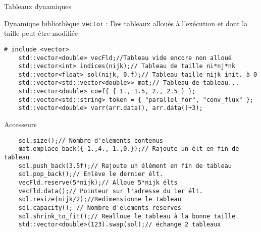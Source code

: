 \documentclass[handout,10pt]{beamer}
\begin{document}
\begin{frame}[fragile]{Tableaux dynamiques}
\tiny
\begin{block}{Dynamique}
bibliothèque \texttt{vector} : Des tableaux alloués à l'exécution et dont la taille peut être modifiée
\begin{lstlisting}
# include <vector>
    std::vector<double> vecFld;//Tableau vide encore non alloué
    std::vector<int> indices(nijk);// Tableau de taille ni*nj*nk
    std::vector<float> sol(nijk, 0.f);// Tableau taille nijk init. à 0
    std::vector<std::vector<double>> mat;// Tableau de tableau...
    std::vector<double> coef{ { 1., 1.5, 2., 2.5 } };
    std::vector<std::string> token = { "parallel_for", "conv_flux" };
    std::vector<double> varr(arr.data(), arr.data()+3);
\end{lstlisting}
\end{block}

\begin{block}{Accesseurs}
\begin{lstlisting}
    sol.size();// Nombre d'elements contenus
    mat.emplace_back({-1.,4.,-1.,0.});// Rajoute un élt en fin de tableau
    sol.push_back(3.5f);// Rajoute un élément en fin de tableau
    sol.pop_back();// Enlève le dernier élt.
    vecFld.reserve(5*nijk);// Alloue 5*nijk élts
    vecFld.data();// Pointeur sur l'adresse du 1er élt.
    sol.resize(nijk/2);//Redimensionne le tableau
    sol.capacity(); // Nombre d'elements reserves
    sol.shrink_to_fit();// Realloue le tableau à la bonne taille
    std::vector<double>(123).swap(sol);// échange 2 tableaux
\end{lstlisting}
\end{block}
\end{frame}
\end{document}
